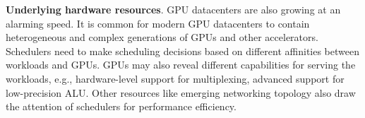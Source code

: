 \textbf{Underlying hardware resources}. GPU datacenters are also growing at an alarming speed. It is common for modern GPU datacenters to contain heterogeneous and complex generations of GPUs and other accelerators. Schedulers need to make scheduling decisions based on different affinities between workloads and GPUs. GPUs may also reveal different capabilities for serving the workloads, e.g., hardware-level support for multiplexing, advanced support for low-precision ALU. Other resources like emerging networking topology also draw the attention of schedulers for performance efficiency.




